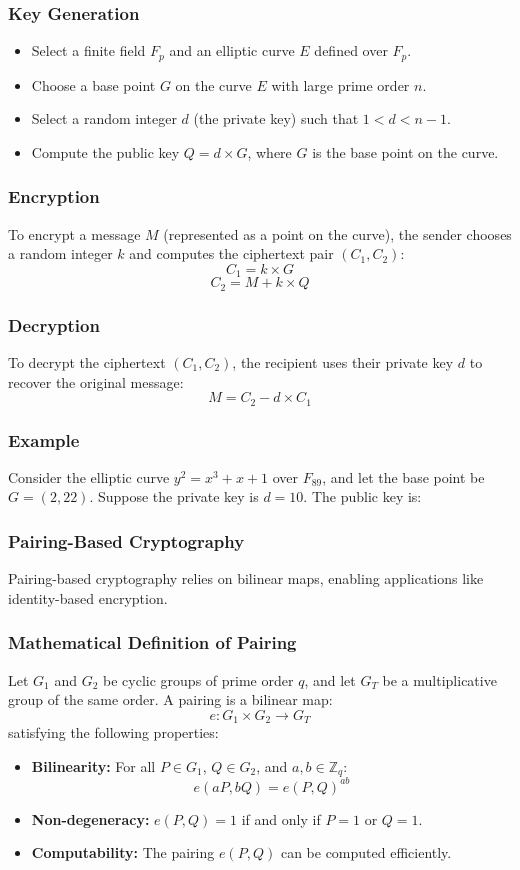 \documentclass{beamer}
\begin{document}
\begin{frame}
\frametitle{Key Generation}
\begin{itemize}
    \item Select a finite field \( F_p \) and an elliptic curve \( E \) defined over \( F_p \).
    \item Choose a base point \( G \) on the curve \( E \) with large prime order \( n \).
    \item Select a random integer \( d \) (the private key) such that \( 1 < d < n-1 \).
    \item Compute the public key \( Q = d \times G \), where \( G \) is the base point on the curve.
\end{itemize}
\end{frame}

\begin{frame}
\frametitle{Encryption}
To encrypt a message \( M \) (represented as a point on the curve), the sender chooses a random integer \( k \) and computes the ciphertext pair \( (C_1, C_2) \):
\[
C_1 = k \times G
\]
\[
C_2 = M + k \times Q
\]
\end{frame}




\begin{frame}
    \frametitle{Decryption}
    To decrypt the ciphertext \( (C_1, C_2) \), the recipient uses their private key \( d \) to recover the original message:
    \[
    M = C_2 - d \times C_1
    \]
\end{frame}

\begin{frame}
    \frametitle{Example}
    Consider the elliptic curve \( y^2 = x^3 + x + 1 \) over \( F_{89} \), and let the base point be \( G = (2, 22) \). Suppose the private key is \( d = 10 \). The public key is:
\end{frame}

\begin{frame}
    \frametitle{Pairing-Based Cryptography}
    Pairing-based cryptography relies on bilinear maps, enabling applications like identity-based encryption.
\end{frame}

\begin{frame}
    \frametitle{Mathematical Definition of Pairing}
    Let \( G_1 \) and \( G_2 \) be cyclic groups of prime order \( q \), and let \( G_T \) be a multiplicative group of the same order. A pairing is a bilinear map:
    \[
    e: G_1 \times G_2 \to G_T
    \]
    satisfying the following properties:
    \begin{itemize}
        \item \textbf{Bilinearity:} For all \( P \in G_1 \), \( Q \in G_2 \), and \( a, b \in \mathbb{Z}_q \):
        \[
        e(aP, bQ) = e(P, Q)^{ab}
        \]
        \item \textbf{Non-degeneracy:} \( e(P, Q) = 1 \) if and only if \( P = 1 \) or \( Q = 1 \).
        \item \textbf{Computability:} The pairing \( e(P, Q) \) can be computed efficiently.
    \end{itemize}
\end{frame}
\end{document}
